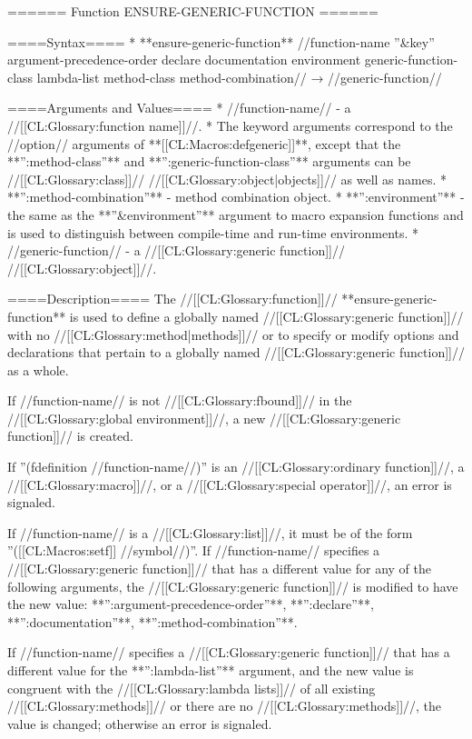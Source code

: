 ====== Function ENSURE-GENERIC-FUNCTION ======

====Syntax====
  * **ensure-generic-function** //function-name ''&key'' argument-precedence-order declare documentation environment generic-function-class lambda-list method-class method-combination// → //generic-function//

====Arguments and Values====
  * //function-name// - a //[[CL:Glossary:function name]]//.
    * The keyword arguments correspond to the //option// arguments of **[[CL:Macros:defgeneric]]**, except that the **'':method-class''** and **'':generic-function-class''** arguments can be //[[CL:Glossary:class]]// //[[CL:Glossary:object|objects]]// as well as names.
    * **'':method-combination''** - method combination object.
    * **'':environment''** - the same as the **''&environment''** argument to macro expansion functions and is used to distinguish between compile-time and run-time environments.
  * //generic-function// - a //[[CL:Glossary:generic function]]// //[[CL:Glossary:object]]//.

====Description====
The //[[CL:Glossary:function]]// **ensure-generic-function** is used to define a globally named //[[CL:Glossary:generic function]]// with no //[[CL:Glossary:method|methods]]// or to specify or modify options and declarations that pertain to a globally named //[[CL:Glossary:generic function]]// as a whole.

If //function-name// is not //[[CL:Glossary:fbound]]// in the //[[CL:Glossary:global environment]]//, a new //[[CL:Glossary:generic function]]// is created.

If ''(fdefinition //function-name//)'' is an //[[CL:Glossary:ordinary function]]//, a //[[CL:Glossary:macro]]//, or a //[[CL:Glossary:special operator]]//, an error is signaled.

If //function-name// is a //[[CL:Glossary:list]]//, it must be of the form ''([[CL:Macros:setf]] //symbol//)''. If //function-name// specifies a //[[CL:Glossary:generic function]]// that has a different value for any of the following arguments, the //[[CL:Glossary:generic function]]// is modified to have the new value: **'':argument-precedence-order''**, **'':declare''**, **'':documentation''**, **'':method-combination''**.

If //function-name// specifies a //[[CL:Glossary:generic function]]// that has a different value for the **'':lambda-list''** argument, and the new value is congruent with the //[[CL:Glossary:lambda lists]]// of all existing //[[CL:Glossary:methods]]// or there are no //[[CL:Glossary:methods]]//, the value is changed; otherwise an error is signaled.

